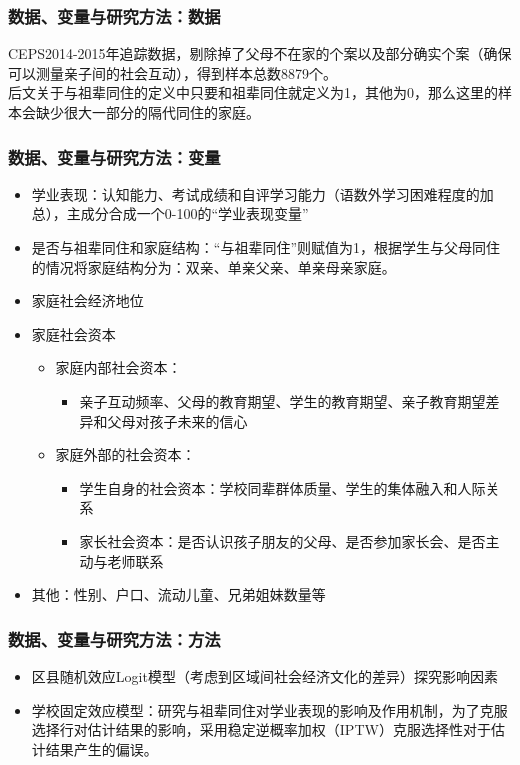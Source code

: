 \documentclass{beamer}
\begin{document}
\begin{frame}
	\frametitle{数据、变量与研究方法：数据}
	CEPS2014-2015年追踪数据，剔除掉了父母不在家的个案以及部分确实个案（确保可以测量亲子间的社会互动），得到样本总数8879个。
	\\ 后文关于与祖辈同住的定义中只要和祖辈同住就定义为1，其他为0，那么这里的样本会缺少很大一部分的隔代同住的家庭。
\end{frame}


\begin{frame}
	\frametitle{数据、变量与研究方法：变量}
	\begin{itemize}
		\item 学业表现：认知能力、考试成绩和自评学习能力（语数外学习困难程度的加总），主成分合成一个0-100的“学业表现变量”
		\item 是否与祖辈同住和家庭结构：“与祖辈同住”则赋值为1，根据学生与父母同住的情况将家庭结构分为：双亲、单亲父亲、单亲母亲家庭。
		\item 家庭社会经济地位
		\item 家庭社会资本
			\begin{itemize}
				\item 家庭内部社会资本：
					\begin{itemize}
						\item 亲子互动频率、父母的教育期望、学生的教育期望、亲子教育期望差异和父母对孩子未来的信心
					\end{itemize}
				\item 家庭外部的社会资本：
					\begin{itemize}
						\item 学生自身的社会资本：学校同辈群体质量、学生的集体融入和人际关系
						\item 家长社会资本：是否认识孩子朋友的父母、是否参加家长会、是否主动与老师联系
						
					\end{itemize}
			\end{itemize}
		\item 其他：性别、户口、流动儿童、兄弟姐妹数量等
	\end{itemize}
\end{frame}

\begin{frame}
	\frametitle{数据、变量与研究方法：方法}
	\begin{itemize}
		\item 区县随机效应Logit模型（考虑到区域间社会经济文化的差异）探究影响因素
		\item 学校固定效应模型：研究与祖辈同住对学业表现的影响及作用机制，为了克服选择行对估计结果的影响，采用稳定逆概率加权（IPTW）克服选择性对于估计结果产生的偏误。
	\end{itemize}
\end{frame}
\end{document}
